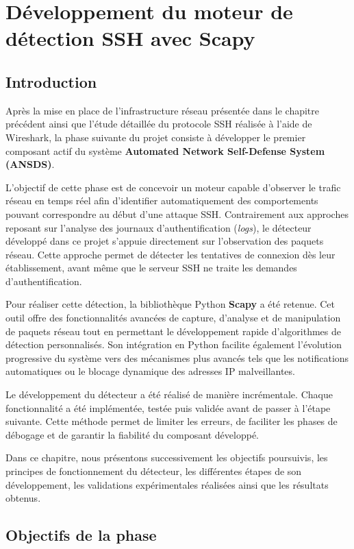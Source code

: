 \chapter{Développement du moteur de détection SSH avec Scapy}

\section{Introduction}

Après la mise en place de l'infrastructure réseau présentée dans le chapitre précédent ainsi que l'étude détaillée du protocole SSH réalisée à l'aide de Wireshark, la phase suivante du projet consiste à développer le premier composant actif du système \textbf{Automated Network Self-Defense System (ANSDS)}.

L'objectif de cette phase est de concevoir un moteur capable d'observer le trafic réseau en temps réel afin d'identifier automatiquement des comportements pouvant correspondre au début d'une attaque SSH. Contrairement aux approches reposant sur l'analyse des journaux d'authentification (\textit{logs}), le détecteur développé dans ce projet s'appuie directement sur l'observation des paquets réseau. Cette approche permet de détecter les tentatives de connexion dès leur établissement, avant même que le serveur SSH ne traite les demandes d'authentification.

Pour réaliser cette détection, la bibliothèque Python \textbf{Scapy} \cite{scapy_docs} a été retenue. Cet outil offre des fonctionnalités avancées de capture, d'analyse et de manipulation de paquets réseau tout en permettant le développement rapide d'algorithmes de détection personnalisés. Son intégration en Python facilite également l'évolution progressive du système vers des mécanismes plus avancés tels que les notifications automatiques ou le blocage dynamique des adresses IP malveillantes.

Le développement du détecteur a été réalisé de manière incrémentale. Chaque fonctionnalité a été implémentée, testée puis validée avant de passer à l'étape suivante. Cette méthode permet de limiter les erreurs, de faciliter les phases de débogage et de garantir la fiabilité du composant développé.

Dans ce chapitre, nous présentons successivement les objectifs poursuivis, les principes de fonctionnement du détecteur, les différentes étapes de son développement, les validations expérimentales réalisées ainsi que les résultats obtenus.

\section{Objectifs de la phase}

